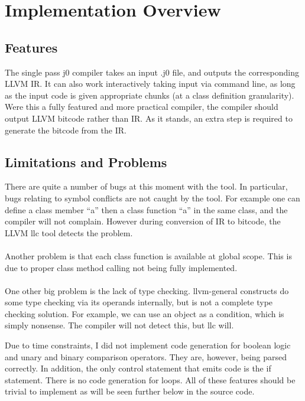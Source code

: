 \documentclass[11pt,a4paper]{article}
\begin{document}
\section{Implementation Overview}
\subsection{Features}
The single pass j0 compiler takes an input .j0 file, and outputs the corresponding LLVM IR. It can also work interactively taking input via command line, as long as the input code is given appropriate chunks (at a class definition granularity). Were this a fully featured and more practical compiler, the compiler should output LLVM bitcode rather than IR. As it stands, an extra step is required to generate the bitcode from the IR.

\subsection{Limitations and Problems}
There are quite a number of bugs at this moment with the tool. In particular, bugs relating to symbol conflicts are not caught by the tool. For example one can define a class member ``a'' then a class function ``a'' in the same class, and the compiler will not complain. However during conversion of IR to bitcode, the LLVM llc tool detects the problem. \\ \\

Another problem is that each class function is available at global scope. This is due to proper class method calling not being fully implemented.\\ \\

One other big problem is the lack of type checking. llvm-general constructs do some type checking via its operands internally, but is not a complete type checking solution. For example, we can use an object as a condition, which is simply nonsense. The compiler will not detect this, but llc will.

Due to time constraints, I did not implement code generation for boolean logic and unary and binary comparison operators. They are, however, being parsed correctly. In addition, the only control statement that emits code is the if statement. There is no code generation for loops. All of these features should be trivial to implement as will be seen further below in the source code.
\end{document}
